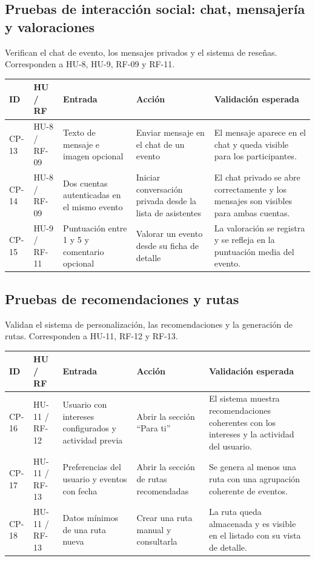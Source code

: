 \subsection{Pruebas de interacción social: chat, mensajería y valoraciones}

Verifican el chat de evento, los mensajes privados y el sistema de reseñas. Corresponden a HU-8, HU-9, RF-09 y RF-11.

\begin{longtable}{|L{1.3cm}|L{1.6cm}|L{3cm}|L{3.8cm}|L{4.3cm}|}
\hline
\textbf{ID} & \textbf{HU / RF} & \textbf{Entrada} & \textbf{Acción} & \textbf{Validación esperada} \\
\hline
{}\label{cp:13}CP-13 & HU-8 / RF-09 & Texto de mensaje e imagen opcional & Enviar mensaje en el chat de un evento & El mensaje aparece en el chat y queda visible para los participantes. \\
\hline
{}\label{cp:14}CP-14 & HU-8 / RF-09 & Dos cuentas autenticadas en el mismo evento & Iniciar conversación privada desde la lista de asistentes & El chat privado se abre correctamente y los mensajes son visibles para ambas cuentas. \\
\hline
{}\label{cp:15}CP-15 & HU-9 / RF-11 & Puntuación entre 1 y 5 y comentario opcional & Valorar un evento desde su ficha de detalle & La valoración se registra y se refleja en la puntuación media del evento. \\
\hline
\end{longtable}

\subsection{Pruebas de recomendaciones y rutas}

Validan el sistema de personalización, las recomendaciones y la generación de rutas. Corresponden a HU-11, RF-12 y RF-13.

\begin{longtable}{|L{1.3cm}|L{1.6cm}|L{3cm}|L{3.8cm}|L{4.3cm}|}
\hline
\textbf{ID} & \textbf{HU / RF} & \textbf{Entrada} & \textbf{Acción} & \textbf{Validación esperada} \\
\hline
{}\label{cp:16}CP-16 & HU-11 / RF-12 & Usuario con intereses configurados y actividad previa & Abrir la sección ``Para ti'' & El sistema muestra recomendaciones coherentes con los intereses y la actividad del usuario. \\
\hline
{}\label{cp:17}CP-17 & HU-11 / RF-13 & Preferencias del usuario y eventos con fecha & Abrir la sección de rutas recomendadas & Se genera al menos una ruta con una agrupación coherente de eventos. \\
\hline
{}\label{cp:18}CP-18 & HU-11 / RF-13 & Datos mínimos de una ruta nueva & Crear una ruta manual y consultarla & La ruta queda almacenada y es visible en el listado con su vista de detalle. \\
\hline
\end{longtable}

